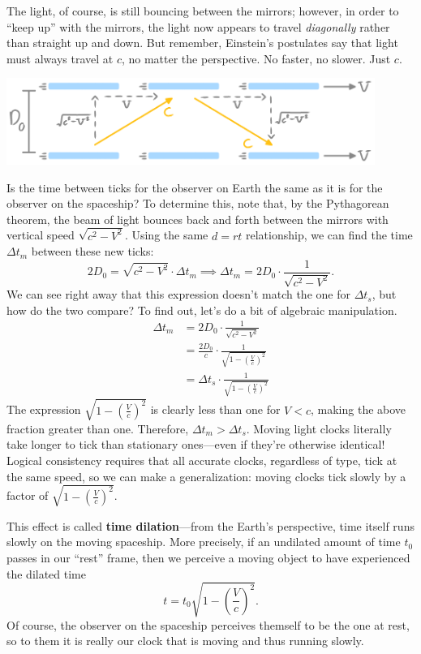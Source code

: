 \documentclass[10pt,a4paper,oneside]{book}
\begin{document}
The light, of course, is still bouncing between the mirrors; however, in order to ``keep up'' with the mirrors, the light now appears to travel \textit{diagonally} rather than straight up and down.
But remember, Einstein's postulates say that light must always travel at $c$, no matter the perspective.
No faster, no slower.
Just $c$.
\begin{center}
    \includegraphics[width=0.9\textwidth]{transLightClock.png}
\end{center}
Is the time between ticks for the observer on Earth the same as it is for the observer on the spaceship?
To determine this, note that, by the Pythagorean theorem, the beam of light bounces back and forth between the mirrors with vertical speed $\sqrt{c^2 - V^2}$.
Using the same $d = rt$ relationship, we can find the time $\Delta t_m$ between these new ticks:
\[ 2D_0 = \sqrt{c^2 - V^2} \cdot \Delta t_m \implies \Delta t_m = 2D_0 \cdot \frac{1}{\sqrt{c^2 - V^2}}. \]
We can see right away that this expression doesn't match the one for $\Delta t_s$, but how do the two compare?
To find out, let's do a bit of algebraic manipulation.
\begin{align*}
    \Delta t_m &= 2D_0 \cdot \frac{1}{\sqrt{c^2 - V^2}} \\
    &= \frac{2D_0}{c} \cdot \frac{1}{\sqrt{1 - \left( \frac{V}{c} \right)^2}} \\
    &= \Delta t_s \cdot \frac{1}{\sqrt{1 - \left( \frac{V}{c} \right)^2}}
\end{align*}
The expression $\sqrt{1 - \left( \frac{V}{c} \right)^2}$ is clearly less than one for $V < c$, making the above fraction greater than one.
Therefore, $\Delta t_m > \Delta t_s$.
Moving light clocks literally take longer to tick than stationary ones---even if they're otherwise identical!
Logical consistency requires that all accurate clocks, regardless of type, tick at the same speed, so we can make a generalization: moving clocks tick slowly by a factor of $\sqrt{1 - \left( \frac{V}{c} \right)^2}$.

This effect is called \textbf{time dilation}---from the Earth's perspective, time itself runs slowly on the moving spaceship.
More precisely, if an undilated amount of time $t_0$ passes in our ``rest'' frame, then we perceive a moving object to have experienced the dilated time
\[ t = t_0 \sqrt{1 - \left( \frac{V}{c} \right)^2}. \]
Of course, the observer on the spaceship perceives themself to be the one at rest, so to them it is really our clock that is moving and thus running slowly.
\end{document}
